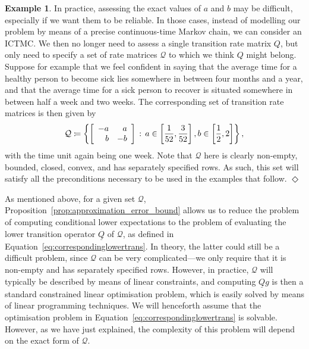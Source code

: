 \documentclass[10pt,a4paper]{paper}
\theoremstyle{definition}
\newtheorem{exmp}{Example}
\newcommand{\rateset}{\mathcal{Q}}
\newcommand{\lrate}{\underline{Q}}
\newcommand{\coloneqq}{:\!=}
\newcommand{\exampleend}{\hfill$\Diamond$}
\newcommand{\ictmc}{{ICTMC}}
\begin{document}
\begin{exmp}
In practice, assessing the exact values of $a$ and $b$ may be difficult, especially if we want them to be reliable. In those cases, instead of modelling our problem by means of a precise continuous-time Markov chain, we can consider an \ictmc. We then no longer need to assess a single transition rate matrix $Q$, but only need to specify a set of rate matrices $\rateset$ to which we think $Q$ might belong. Suppose for example that we feel confident in saying that the average time for a healthy person to become sick lies somewhere in between four months and a year, and that the average time for a sick person to recover is situated somewhere in between half a week and two weeks. The corresponding set of transition rate matrices is then given by
\vspace{3pt}
\begin{equation}\label{eq:num_example_rateset_params}
\rateset \coloneqq \left\{\left[\begin{array}{rr}
-a & a \\
b & -b
\end{array}\right]\,:\,a\in\left[\frac{1}{52},\frac{3}{52}\right], b\in\left[\frac{1}{2},2\right]\right\},
\vspace{3pt}
\end{equation}
with the time unit again being one week. Note that $\rateset$ here is clearly non-empty, bounded, closed, convex, and has separately specified rows. As such, this set will satisfy all the preconditions necessary to be used in the examples that follow.
\exampleend
\end{exmp}


As mentioned above, for a given set $\rateset$, Proposition~\ref{prop:approximation_error_bound} allows us to reduce the problem of computing conditional lower expectations to the problem of evaluating the lower transition operator $\lrate$ of $\rateset$, as defined in Equation~\eqref{eq:correspondinglowertrans}. In theory, the latter could still be a difficult problem, since $\rateset$ can be very complicated---we only require that it is non-empty and has separately specified rows. However, in practice, $\rateset$ will typically be described by means of linear constraints, and computing $\lrate g$ is then a standard constrained linear optimisation problem, which is easily solved by means of linear programming techniques. 
We will henceforth assume that the optimisation problem in Equation~\eqref{eq:correspondinglowertrans} is solvable. However, as we have just explained, the complexity of this problem will depend on the exact form of $\rateset$.
\end{document}
